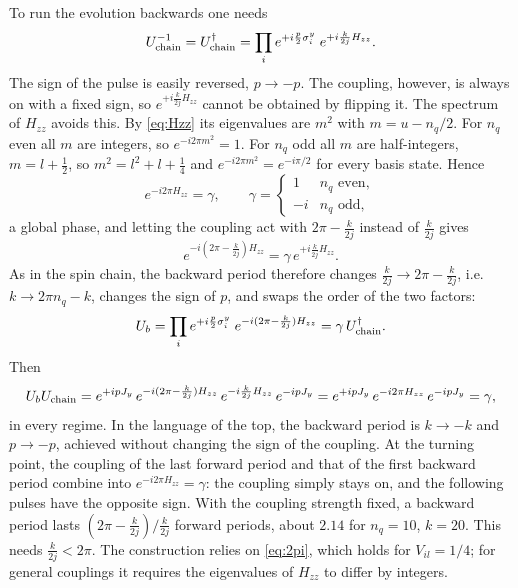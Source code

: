 \documentclass[11pt,a4paper]{article}
\begin{document}
To run the evolution backwards one needs
\begin{equation}
  U_{\rm chain}^{-1} = U_{\rm chain}^\dagger = \prod_{i}e^{+i\frac p2\sigma^y_i}\;e^{+i\frac{k}{2j}H_{zz}} .
\end{equation}
The sign of the pulse is easily reversed, $p\to-p$. The coupling, however, is always on with a fixed sign, so
$e^{+i\frac{k}{2j}H_{zz}}$ cannot be obtained by flipping it. The spectrum of $H_{zz}$ avoids this. By \cref{eq:Hzz}
its eigenvalues are $m^2$ with $m=u-n_q/2$. For $n_q$ even all $m$ are integers, so $e^{-i2\pi m^2}=1$. For $n_q$ odd
all $m$ are half-integers, $m=l+\frac12$, so $m^2=l^2+l+\frac14$ and $e^{-i2\pi m^2}=e^{-i\pi/2}$ for every basis
state. Hence
\begin{equation}\label{eq:2pi}
  e^{-i2\pi H_{zz}} = \gamma,\qquad \gamma = \begin{cases} 1 & n_q \text{ even},\\ -i & n_q\text{ odd},\end{cases}
\end{equation}
a global phase, and letting the coupling act with $2\pi-\frac{k}{2j}$ instead of $\frac{k}{2j}$ gives
\begin{equation}
  e^{-i(2\pi-\frac{k}{2j})H_{zz}} = \gamma\,e^{+i\frac{k}{2j}H_{zz}} .
\end{equation}
As in the spin chain, the backward period therefore changes $\frac{k}{2j}\to2\pi-\frac{k}{2j}$, i.e.\
$k\to2\pi n_q-k$, changes the sign of $p$, and swaps the order of the two factors:
\begin{equation}\label{eq:Ub}
  U_b = \prod_{i}e^{+i\frac p2\sigma^y_i}\;e^{-i(2\pi-\frac{k}{2j})H_{zz}} = \gamma\,U_{\rm chain}^\dagger .
\end{equation}
Then
\begin{equation}
  U_bU_{\rm chain} = e^{+ipJ_y}\,e^{-i(2\pi-\frac{k}{2j})H_{zz}}\,e^{-i\frac{k}{2j}H_{zz}}\,e^{-ipJ_y}
  = e^{+ipJ_y}\,e^{-i2\pi H_{zz}}\,e^{-ipJ_y} = \gamma ,
\end{equation}
in every regime. In the language of the top, the backward period is $k\to-k$ and $p\to-p$, achieved without changing
the sign of the coupling. At the turning point, the coupling of the last forward period and that of the first backward
period combine into $e^{-i2\pi H_{zz}}=\gamma$: the coupling simply stays on, and the following pulses have the
opposite sign. With the coupling strength fixed, a backward period lasts $(2\pi-\frac{k}{2j})/\frac{k}{2j}$ forward
periods, about $2.14$ for $n_q=10$, $k=20$. This needs $\frac{k}{2j}<2\pi$. The construction relies on
\cref{eq:2pi}, which holds for $V_{il}=1/4$; for general couplings it requires the eigenvalues of $H_{zz}$ to differ by
integers.
\end{document}
